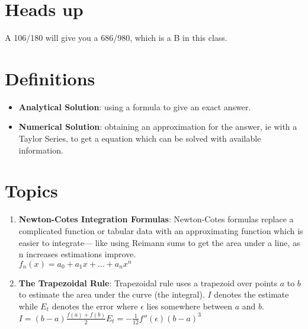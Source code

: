 \documentclass[fontsize=5pt]{scrartcl}
\begin{document}
\begin{multicols}{3}
  \section{Heads up}
  A 106/180 will give you a 686/980, which is a B in this class. 
  
  \section{Definitions}
    \begin{itemize}
      \item \textbf{Analytical Solution}: using a formula to give an exact answer.
      \item \textbf{Numerical Solution}: obtaining an approximation for the answer, 
            ie with a Taylor Series, to get a equation which can be solved with available
            information.
    \end{itemize}

  \section{Topics}
    \begin{enumerate}
      \item \textbf{Newton-Cotes Integration Formulas}: Newton-Cotes formulas replace a complicated function
        or tabular data with an approximating function which is easier to integrate--- like using Reimann sums 
        to get the area under a line, as n increases estimations improve. \\
        \begin{math}
          f_n(x)=a_0+a_1x+\ldots+a_nx^n
        \end{math}
    
      \item \textbf{The Trapezoidal Rule}: Trapezoidal rule uses a trapezoid over points $a$ to $b$
        to estimate the area under the curve (the integral). $I$ denotes the estimate while $E_t$
        denotes the error where $\epsilon$ lies somewhere between $a$ and $b$.\\
        \begin{math}
          I=(b-a)\frac{f(a)+f(b)}{2}
          E_t=-\frac{1}{12}f''(\epsilon)(b-a)^3
        \end{math}
      

\end{enumerate}
\end{multicols}
\end{document}
